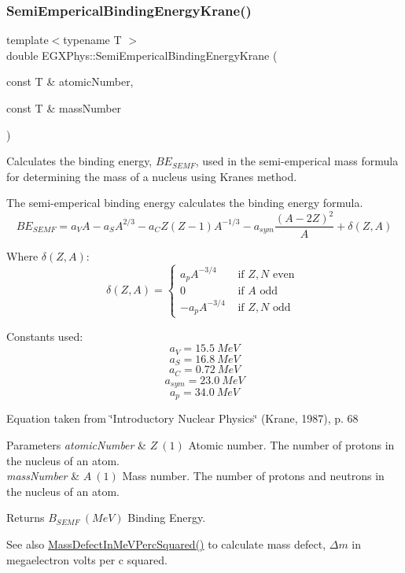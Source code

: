 \subsubsection{\texorpdfstring{Semi\+Emperical\+Binding\+Energy\+Krane()}{SemiEmpericalBindingEnergyKrane()}}
{\footnotesize\ttfamily template$<$typename T $>$ \\
double E\+G\+X\+Phys\+::\+Semi\+Emperical\+Binding\+Energy\+Krane (\begin{DoxyParamCaption}\item[{const T \&}]{atomic\+Number,  }\item[{const T \&}]{mass\+Number }\end{DoxyParamCaption})}



Calculates the binding energy, $BE_{SEMF}$, used in the semi-\/emperical mass formula for determining the mass of a nucleus using Krane\textquotesingle{}s method. 

The semi-\/emperical binding energy calculates the binding energy formula. \[BE_{SEMF} = a_V A - a_S A^{2/3}-a_C Z(Z-1)A^{-1/3}-a_{sym}\frac{(A-2Z)^2}{A}+\delta(Z,A)\]

Where $\delta(Z,A)$\+: \[\delta(Z,A)=\begin{cases} a_pA^{-3/4} & \text{ if } Z,N\text{ even }\\ 0 & \text{ if } A \text{ odd }\\ -a_pA^{-3/4} & \text{ if } Z,N \text{ odd } \end{cases}\]

Constants used\+: \[a_V = 15.5\ MeV\] \[a_S = 16.8\ MeV\] \[a_C = 0.72\ MeV\] \[a_{sym} = 23.0\ MeV\] \[a_p = 34.0\ MeV\]

Equation taken from \char`\"{}\+Introductory Nuclear Physics\char`\"{} (Krane, 1987), p. 68


\begin{DoxyParams}{Parameters}
{\em atomic\+Number} & $Z\ (1)$ Atomic number. The number of protons in the nucleus of an atom. \\
\hline
{\em mass\+Number} & $A\ (1)$ Mass number. The number of protons and neutrons in the nucleus of an atom. \\
\hline
\end{DoxyParams}
\begin{DoxyReturn}{Returns}
$B_{SEMF}\ (MeV)$ Binding Energy. 
\end{DoxyReturn}
\begin{DoxySeeAlso}{See also}
\mbox{\hyperlink{group___e_g_x_phys-_mass_defect_gab51169bf871d0ea0ee0642fa300228fe}{Mass\+Defect\+In\+Me\+V\+Perc\+Squared()}} to calculate mass defect, $\Delta m$ in megaelectron volts per c squared. 
\end{DoxySeeAlso}
